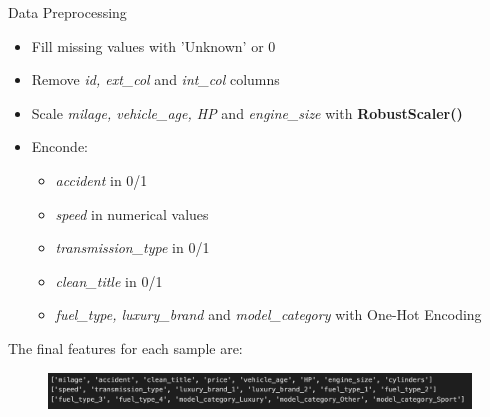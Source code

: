 \documentclass{beamer}
\begin{document}
\begin{frame}{Data Preprocessing}
    \begin{itemize}
        \item Fill missing values with 'Unknown' or 0
        \item Remove \textit{id, ext\_col} and \textit{int\_col} columns
        \item Scale \textit{milage, vehicle\_age, HP} and \textit{engine\_size} with \textbf{RobustScaler()}
        \item Enconde:
            \begin{itemize}
                \item \textit{accident} in 0/1
                \item \textit{speed} in numerical values
                \item \textit{transmission\_type} in 0/1
                \item \textit{clean\_title} in 0/1
                \item \textit{fuel\_type, luxury\_brand} and \textit{model\_category} with One-Hot Encoding
            \end{itemize}
    \end{itemize}
    The final features for each sample are:
    \begin{figure}
            \centering
            \includegraphics[width=1\linewidth]{images/POST-PROCESS_DATA_HEAD.png}
            \label{fig:enter-label}
    \end{figure}
\end{frame}

\end{document}

